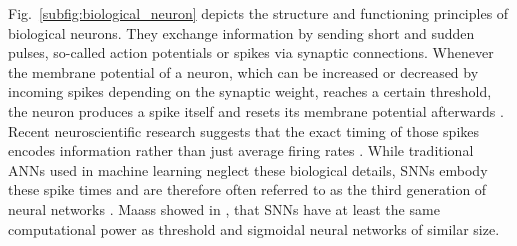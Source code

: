 Fig.~\ref{subfig:biological_neuron} depicts the structure and functioning principles of biological neurons.
They  exchange information by sending short and sudden pulses, so-called action potentials or spikes via synaptic connections.
Whenever the membrane potential of a neuron, which can be increased or decreased by incoming spikes depending on the synaptic weight, reaches a certain threshold, the neuron produces a spike itself and resets its membrane potential afterwards \cite{Gerstner2002, Paugam2009}.
Recent neuroscientific research suggests that the exact timing of those spikes encodes information rather than just average firing rates \cite{Bohte2004}.
While traditional \acp{ANN} used in machine learning neglect these biological details, \acp{SNN} embody these spike times and are therefore often referred to as the third generation of neural networks \cite{Maass1997, Paugam2009}.
Maass showed in \cite{Maass1997}, that \acp{SNN} have at least the same computational power as threshold and sigmoidal neural networks of similar size.

